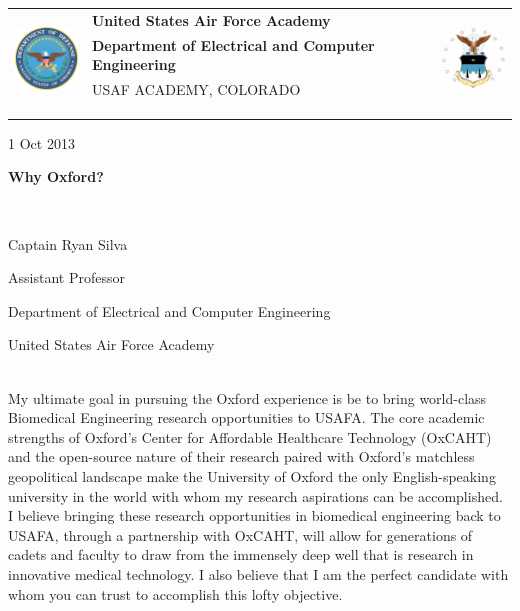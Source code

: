 \documentclass{article}
\begin{document}
	\noindent \begin{tabu} to \textwidth{l X[c] r}
	 & 
	\textbf{United States Air Force Academy} &  
	\\
	& \textbf{Department of Electrical and Computer Engineering} & \\
	& \tiny{USAF ACADEMY, COLORADO}\\
	\\ \\ \\
	\end{tabu}

	\hfill 1 Oct 2013
	\centerline{\LARGE{\textbf{Why Oxford?}}} \hspace{0pt} \\
	\centerline{\Large{Captain Ryan Silva}}
	\centerline{\large{Assistant Professor}}
	\centerline{\large{Department of Electrical and Computer Engineering}}
	\centerline{\large{United States Air Force Academy}} \hspace{0pt} \\
\indent My ultimate goal in pursuing the Oxford experience is be to bring world-class
Biomedical Engineering research opportunities to USAFA. The core academic
strengths of Oxford's Center for Affordable Healthcare Technology (OxCAHT) and
the open-source nature of their research paired with Oxford's matchless
geopolitical landscape make the University of Oxford the only English-speaking
university in the world with whom my research aspirations can be accomplished.
I believe bringing these research opportunities in biomedical engineering back
to USAFA, through a partnership with OxCAHT, will allow for generations of cadets
and faculty to draw from the immensely deep well that is research in innovative medical technology.
I also believe that I am the perfect candidate with whom you can trust to accomplish
this lofty objective.
\end{document}
